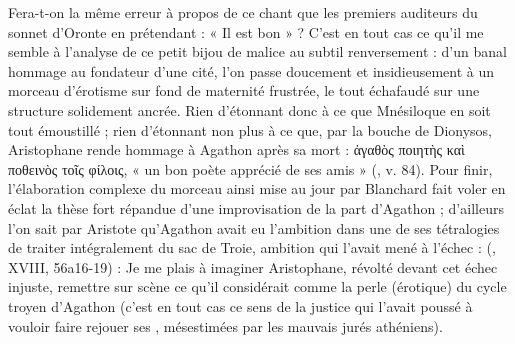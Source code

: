 {Fera-t-on la même erreur à propos de ce chant que les premiers auditeurs du sonnet d'Oronte en prétendant : « Il est bon » ? C'est en tout cas ce qu'il me semble à l'analyse de ce petit bijou de malice au subtil renversement : d'un banal hommage au fondateur d'une cité, l'on passe doucement et insidieusement à un morceau d'érotisme sur fond de maternité frustrée, le tout échafaudé sur une structure solidement ancrée. Rien d'étonnant donc à ce que Mnésiloque en soit tout émoustillé ; rien d'étonnant non plus à ce que, par la bouche de Dionysos, Aristophane rende hommage à Agathon après sa mort : ἀγαθὸς ποιητὴς καὶ ποθεινὸς τοῖς φίλοις, « un bon poète apprécié de ses amis » (, v. 84). Pour finir, l'élaboration complexe du morceau ainsi mise au jour par Blanchard fait voler en éclat la thèse fort répandue d'une improvisation de la part d'Agathon ; d'ailleurs l'on sait par Aristote qu'Agathon avait eu l'ambition dans une de ses tétralogies de traiter intégralement du sac de Troie, ambition qui l'avait mené à l'échec : (, XVIII, 56a16-19) :
Je me plais à imaginer Aristophane, révolté devant cet échec injuste, remettre sur scène ce qu'il considérait comme la perle (érotique) du cycle troyen d'Agathon (c'est en tout cas ce sens de la justice qui l'avait poussé à vouloir faire rejouer ses , mésestimées par les mauvais jurés athéniens).}
